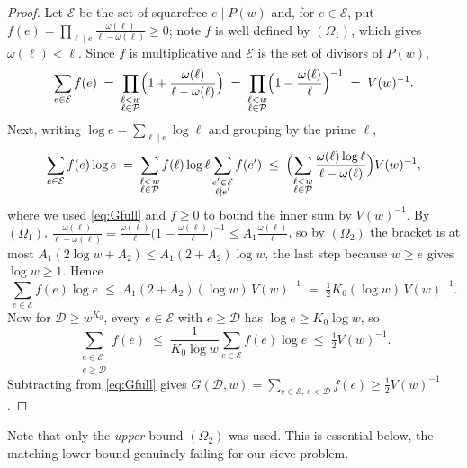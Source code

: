 \documentclass[10pt]{article}
\theoremstyle{definition}
\theoremstyle{remark}
\begin{document}
\begin{proof}
Let $\mathcal{E}$ be the set of squarefree $e \mid P(w)$ and, for
$e \in \mathcal{E}$, put $f(e) = \prod_{\ell \mid e}
\frac{\omega(\ell)}{\ell-\omega(\ell)} \ge 0$; note $f$ is well defined by
$(\Omega_1)$, which gives $\omega(\ell) < \ell$. Since $f$ is multiplicative
and $\mathcal{E}$ is the set of divisors of $P(w)$,
\begin{equation}\label{eq:Gfull}
  \sum_{e \in \mathcal{E}} f(e)
  \;=\; \prod_{\substack{\ell < w \\ \ell \in \mathcal{P}}}
    \Bigl(1 + \frac{\omega(\ell)}{\ell - \omega(\ell)}\Bigr)
  \;=\; \prod_{\substack{\ell < w \\ \ell \in \mathcal{P}}}
    \Bigl(1 - \frac{\omega(\ell)}{\ell}\Bigr)^{-1}
  \;=\; V(w)^{-1}.
\end{equation}
Next, writing $\log e = \sum_{\ell \mid e}\log\ell$ and grouping by the prime
$\ell$,
\[
  \sum_{e \in \mathcal{E}} f(e)\log e
  \;=\; \sum_{\substack{\ell < w \\ \ell \in \mathcal{P}}} f(\ell)\log\ell
    \sum_{\substack{e' \in \mathcal{E} \\ \ell \nmid e'}} f(e')
  \;\le\; \Bigl(\sum_{\substack{\ell < w \\ \ell \in \mathcal{P}}}
      \frac{\omega(\ell)\log\ell}{\ell - \omega(\ell)}\Bigr) V(w)^{-1},
\]
where we used \eqref{eq:Gfull} and $f \ge 0$ to bound the inner sum by
$V(w)^{-1}$. By $(\Omega_1)$,
$\frac{\omega(\ell)}{\ell-\omega(\ell)}
 = \frac{\omega(\ell)}{\ell}\bigl(1-\frac{\omega(\ell)}{\ell}\bigr)^{-1}
 \le A_1 \frac{\omega(\ell)}{\ell}$, so by $(\Omega_2)$ the bracket is at most
$A_1(2\log w + A_2) \le A_1(2 + A_2)\log w$, the last step because
$w \ge e$ gives $\log w \ge 1$. Hence
\[
  \sum_{e \in \mathcal{E}} f(e)\log e
  \;\le\; A_1(2+A_2)(\log w)\,V(w)^{-1}
  \;=\; \tfrac12 K_0 (\log w)\, V(w)^{-1}.
\]
Now for $\mathcal{D} \ge w^{K_0}$, every $e \in \mathcal{E}$ with
$e \ge \mathcal{D}$ has $\log e \ge K_0\log w$, so
\[
  \sum_{\substack{e \in \mathcal{E} \\ e \ge \mathcal{D}}} f(e)
  \;\le\; \frac{1}{K_0 \log w}\sum_{e \in \mathcal{E}} f(e)\log e
  \;\le\; \tfrac12 V(w)^{-1}.
\]
Subtracting from \eqref{eq:Gfull} gives
$G(\mathcal{D},w) = \sum_{e \in \mathcal{E},\, e < \mathcal{D}} f(e)
\ge \tfrac12 V(w)^{-1}$.
\end{proof}

Note that only the \emph{upper} bound $(\Omega_2)$ was used. This is essential
below, the matching lower bound genuinely failing for our sieve problem.
\end{document}
